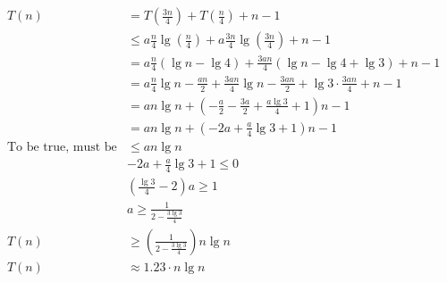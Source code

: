 \documentclass[english, 10pt]{article}
\begin{document}
\begin{align*}
    T(n) &= T(\frac{3n}{4}) + T(\frac{n}{4}) +n -1 \\
    &\le a\frac{n}{4}\lg\left( \frac{n}{4} \right) + a\frac{3n}{4}\lg\left( \frac{3n}{4} \right) +n -1 \\
    &= a\frac{n}{4}\left( \lg n - \lg 4 \right) + \frac{3an}{4}\left( \lg n - \lg 4 + \lg 3 \right)+n -1 \\
    &= a\frac{n}{4}\lg n - \frac{an}{2} + \frac{3an}{4}\lg n - \frac{3an}{2} + \lg 3 \cdot\frac{3an}{4} +n -1 \\
    &= an\lg n + \left( -\frac{a}{2} -\frac{3a}{2} +\frac{a\lg 3}{4} +1 \right)n -1 \\
    &= an\lg n + \left( -2a +\frac{a}{4}\lg 3 +1 \right)n -1 \\
    \text{To be true, must be} &\le an\lg n \\
    & -2a +\frac{a}{4}\lg 3 + 1 \le 0 \\
    & (\frac{\lg 3}{4}-2)a \ge 1 \\
    & a \ge \frac{1}{2-\frac{3\lg 3}{4}} \\
    T(n) &\ge\left(\frac{1}{2-\frac{3\lg 3}{4}}\right) n\lg n \\
    T(n) &\approx 1.23\cdot n \lg n \\
\end{align*}
\end{document}
